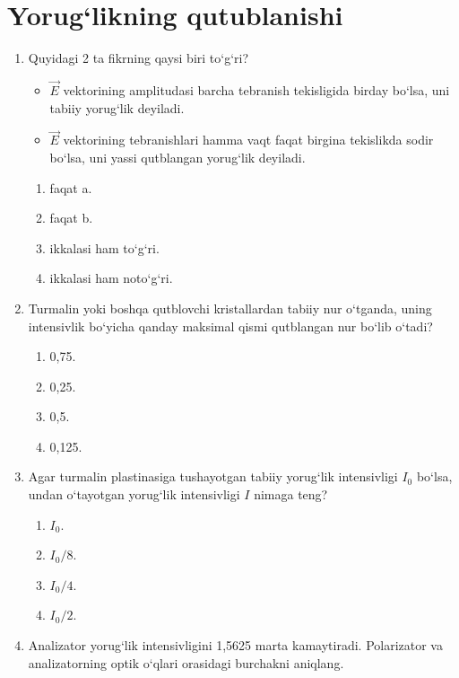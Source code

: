 
\section{Yorug`likning qutublanishi}



\begin{enumerate}

\item Quyidagi 2 ta fikrning qaysi biri to‘g‘ri?
\begin{itemize}
    \item[a)] $\vec{E}$ vektorining amplitudasi barcha tebranish tekisligida birday bo‘lsa, uni tabiiy yorug‘lik deyiladi.
    \item[b)] $\vec{E}$ vektorining tebranishlari hamma vaqt faqat birgina tekislikda sodir bo‘lsa, uni yassi qutblangan yorug‘lik deyiladi.
\end{itemize}
\begin{enumerate}[label=\Alph*)]
\item faqat a.
\item faqat b.
\item ikkalasi ham to‘g‘ri.
\item ikkalasi ham noto‘g‘ri.
\end{enumerate}

\item Turmalin yoki boshqa qutblovchi kristallardan tabiiy nur o‘tganda, uning intensivlik bo‘yicha qanday maksimal qismi qutblangan nur bo‘lib o‘tadi?
\begin{enumerate}[label=\Alph*)]
\item 0,75.
\item 0,25.
\item 0,5.
\item 0,125.
\end{enumerate}

\item Agar turmalin plastinasiga tushayotgan tabiiy yorug‘lik intensivligi $I_0$ bo‘lsa, undan o‘tayotgan yorug‘lik intensivligi $I$ nimaga teng?
\begin{enumerate}[label=\Alph*)]
\item $I_0$.
\item $I_0/8$.
\item $I_0/4$.
\item $I_0/2$.
\end{enumerate}

\item Analizator yorug‘lik intensivligini 1,5625 marta kamaytiradi. Polarizator va analizatorning optik o‘qlari orasidagi burchakni aniqlang.


\end{enumerate}
